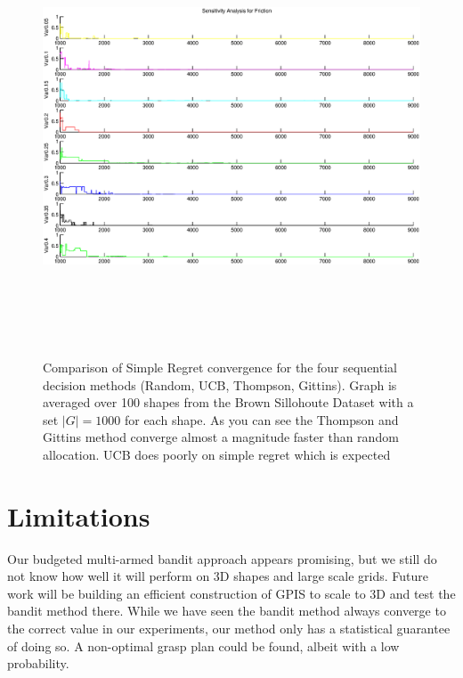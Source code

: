 \documentclass[letterpaper, 10 pt, conference]{ieeeconf}  %
\begin{document}
\begin{figure}[ht!]
\centering
\includegraphics[width = 16.5cm, height = 13cm]{matlab_figures/sensitivity_fric.eps}
\caption{ \footnotesize Comparison of Simple Regret convergence for the four sequential decision methods (Random, UCB, Thompson, Gittins). Graph is averaged over 100 shapes from the Brown Sillohoute Dataset \cite{brown} with a set $|G|=1000$ for each shape. As you can see the Thompson and Gittins method converge almost a magnitude faster than random allocation. UCB does poorly on simple regret which is expected \cite{best_arm}}
\vspace*{-10pt}
\label{fig:simple_regret}
\end{figure}

\section{Limitations} 

Our budgeted multi-armed bandit approach appears promising, but we still do not know how well it will perform on 3D shapes and large scale grids. Future work will be building an efficient construction of GPIS to scale to 3D and test the bandit method there. While we have seen the bandit method always converge to the correct value in our experiments, our method only has a statistical guarantee of doing so. A non-optimal grasp plan could be found, albeit with a low probability. 
\end{document}
